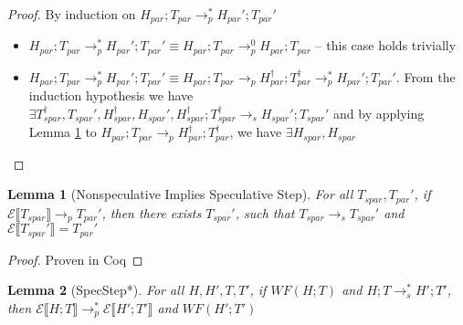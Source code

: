 \documentclass[9pt]{article}
\newtheorem{theorem}{Theorem}
\newtheorem{lemma}{Lemma}
\newcommand\specStep{\rightarrow_{s}}
\newcommand\parStep{\rightarrow_{p}}
\newcommand{\erase}[1]{\mathcal{E}\llbracket #1 \rrbracket}
\begin{document}
\begin{proof}
By induction on $H_{par}; T_{par} \parStep^* H_{par}'; T_{par}'$

\begin{itemize}
\item $H_{par}; T_{par} \parStep^* H_{par}'; T_{par}' \equiv H_{par}; T_{par} \parStep^0 H_{par}; T_{par}$ -- this case holds trivially

\item $H_{par}; T_{par} \parStep^* H_{par}'; T_{par}' \equiv H_{par}; T_{par} \parStep H_{par}^\dagger; T_{par}^\dagger \parStep^* H_{par}'; T_{par}'$.  From the induction hypothesis we have $\exists T_{spar}^\dagger, T_{spar}', H_{spar}^\dagger, H_{spar}', H_{spar}^\dagger; T_{spar}^\dagger \specStep H_{spar}'; T_{spar}'$ and by applying Lemma \ref{StructuralStep} to $H_{par}; T_{par} \parStep H_{par}^\dagger; T_{par}^\dagger$, we have $\exists H_{spar}, H_{spar}$
\end{itemize}
\vspace{-2em}
\end{proof}
\begin{lemma}[Nonspeculative Implies Speculative Step]
\label{StructuralStep}
For all $T_{spar}, T_{par}'$, if $\mathcal{E} \llbracket T_{spar}\rrbracket \parStep T_{par}'$, then there exists $T_{spar}'$, such that $T_{spar} \specStep T_{spar}'$ and $\mathcal{E}\llbracket T_{spar}'\rrbracket = T_{par}'$
\end{lemma}
\begin{proof}
Proven in Coq
\end{proof}

%
%
%

\begin{lemma}[SpecStep*]
\label{specStepStar}
For all $H, H', T, T'$, if $WF(H; T)$ and $H; T \specStep^* H'; T'$, then $\erase{H; T} \parStep^* \erase{H'; T'}$ and $WF(H'; T')$
\end{lemma}
\end{document}
